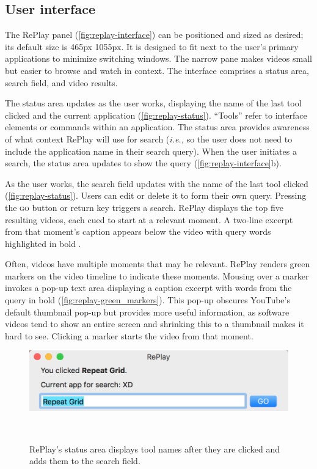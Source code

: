 \subsection{User interface}
The RePlay panel (\autoref{fig:replay-interface}) can be positioned and sized as desired; its default size is 465px \texttimes 1055px. It is designed to fit next to the user's primary applications to minimize switching windows. The narrow pane makes videos small but easier to browse and watch in context. The interface comprises a status area, search field, and video results.

The status area updates as the user works, displaying the name of the last tool clicked and the current application (\autoref{fig:replay-status}). ``Tools'' refer to interface elements or commands within an application. The status area provides awareness of what context RePlay will use for search (\textit{i.e.,} so the user does not need to include the application name in their search query). When the user initiates a search, the status area updates to show the query (\autoref{fig:replay-interface}b).

As the user works, the search field updates with the name of the last tool clicked (\autoref{fig:replay-status}). Users can edit or delete it to form their own query. Pressing the \textsc{go} button or return key triggers a search. RePlay displays the top five resulting videos, each cued to start at a relevant moment. A two-line excerpt from that moment's caption appears below the video with query words highlighted in bold \cite{Hearst2009}.

Often, videos have multiple moments that may be relevant. RePlay renders green markers on the video timeline to indicate these moments. Mousing over a marker invokes a pop-up text area displaying a caption excerpt with words from the query in bold (\autoref{fig:replay-green_markers}). This pop-up obscures YouTube's default thumbnail pop-up but provides more useful information, as software videos tend to show an entire screen and shrinking this to a thumbnail makes it hard to see. Clicking a marker starts the video from that moment. 

\begin{figure}[b!]
\centering
\vspace{-0.2in}
  \includegraphics[width=\textwidth]{replay/figures/replay_status.png}
  \caption{RePlay's status area displays tool names after they are clicked and adds them to the search field. }~\label{fig:replay-status}
  \vspace{-0.2in}
\end{figure}


